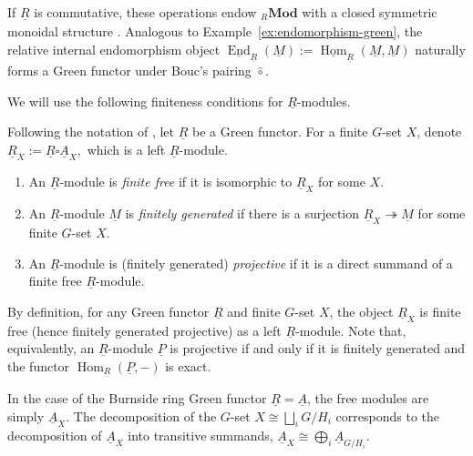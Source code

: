 \documentclass[11pt,oneside]{amsart}
\DeclareMathOperator{\Hom}{Hom}
\DeclareMathOperator{\End}{End}
\numberwithin{equation}{section}
\numberwithin{figure}{section}
\theoremstyle{plain}
\theoremstyle{definition}
\theoremstyle{remark}
\begin{document}
If $\underline{R}$ is commutative, these operations endow ${}_{\underline{R}}\mathbf{Mod}$ with a closed symmetric monoidal structure \cite{lewis1981theory}. Analogous to Example~\ref{ex:endomorphism-green}, the relative internal endomorphism object $\underline{\End}_{\underline{R}}(\underline{M}) := \underline{\Hom}_{\underline{R}}(\underline{M},\underline{M})$ naturally forms a Green functor under Bouc's pairing $\hat{\circ}$.

  
We will use the following finiteness conditions for $\underline R$-modules.

\begin{definition}\label{def:finiteness-R-modules}Following the notation of \cite[Definition 3.10]{CCM}, let
      \( \underline{R} \) be a Green functor. For a finite \( G \)-set \( X \), denote  
    \(\underline{R}_X := \underline{R} \square \underline{A}_X,
    \)
    which is a left \( \underline{R} \)-module.
    
    \begin{enumerate}
        \item An \( \underline{R} \)-module is \textit{finite free} if it is isomorphic to \( \underline{R}_X \) for some \( X \).
        
        \item An $\underline R$-module $\underline M$ is
\emph{finitely generated} if there is a surjection
\(
\underline R_X\twoheadrightarrow \underline M
\)
for some finite $G$-set $X$.
        
        \item An \( \underline{R} \)-module is (finitely generated) \textit{projective} if it is a direct summand of a finite free $\underline R$-module.
    \end{enumerate}
\end{definition}




\begin{remark}
By definition, for any Green functor $\underline{R}$ and finite $G$-set $X$, the object $\underline{R}_X$ is finite free (hence finitely generated projective) as a left $\underline{R}$-module. Note that, equivalently, an $\underline{R}$-module $\underline{P}$ is projective if and only if it is finitely generated and the functor $\Hom_{\underline{R}}(\underline{P}, -)$ is exact.

In the case of the Burnside ring Green functor $\underline{R}=\underline{A}$, the free modules are simply $\underline{A}_X$. The decomposition of the $G$-set $X \cong \bigsqcup_i G/H_i$ corresponds to the decomposition of $\underline{A}_X$ into transitive summands, $\underline{A}_X \cong \bigoplus_i \underline{A}_{G/H_i}$.
\end{remark}
 
\end{document}
